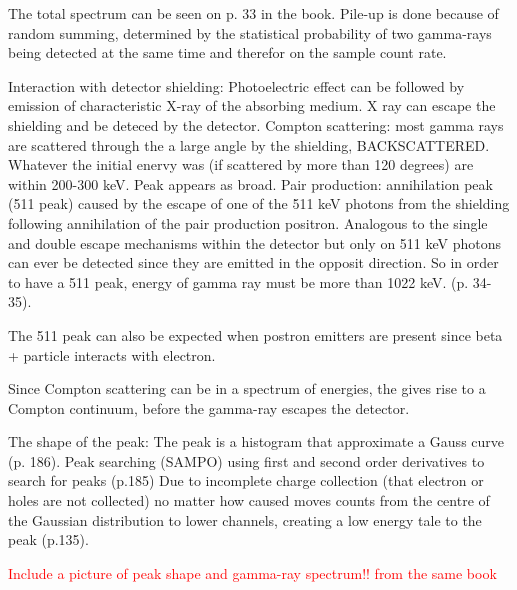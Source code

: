 The total spectrum can be seen on p. 33 in the book. Pile-up is done because of random summing, determined by the statistical probability of two gamma-rays being detected at the same time and therefor on the sample count rate. 

Interaction with detector shielding: Photoelectric effect can be followed by emission of characteristic X-ray of the absorbing medium. X ray can escape the shielding and be deteced by the detector. Compton scattering: most gamma rays are scattered through the a large angle by the shielding, BACKSCATTERED. Whatever the initial enervy  was (if scattered by more than 120 degrees) are within 200-300 keV. Peak appears as broad. Pair production: annihilation peak (511 peak) caused by the escape of one of the 511 keV photons from the shielding following annihilation of the pair production positron. Analogous to the single and double escape mechanisms within the detector but only on 511 keV photons can ever be detected since they are emitted in the opposit direction. So in order to have a 511 peak, energy of gamma ray must be more than 1022 keV. (p. 34-35).

The 511 peak can also be expected when postron emitters are present since beta + particle interacts with electron.  

Since Compton scattering can be in a spectrum of energies, the gives rise to a Compton continuum, before the gamma-ray escapes the detector. 


The shape of the peak: The peak is a histogram that approximate a Gauss curve (p. 186). Peak searching (SAMPO) using first and second order derivatives to search for peaks (p.185)
Due to incomplete charge collection (that electron or holes are not collected) no matter how caused moves counts from the centre of the Gaussian distribution to lower channels, creating a low energy tale to the peak (p.135).  

\textcolor{red}{Include a picture of peak shape and gamma-ray spectrum!! from the same book}
